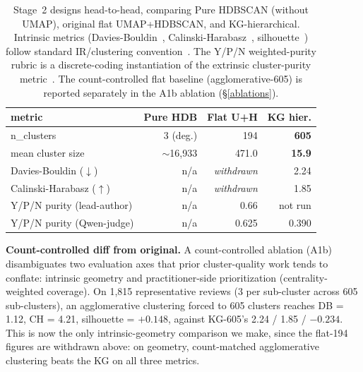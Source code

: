 \documentclass[sigconf, anonymous]{acmart}
\begin{document}
\begin{table}[t]\centering\footnotesize
  \caption{Stage~2 designs head-to-head, comparing Pure HDBSCAN (without UMAP), original flat
  UMAP+HDBSCAN, and KG-hierarchical. Intrinsic metrics (Davies-Bouldin~\cite{davies1979cluster},
   Calinski-Harabasz~\cite{calinski1974dendrite}, silhouette~\cite{rousseeuw1987silhouettes})
  follow standard IR/clustering convention~\cite{schutze2008introduction,
  steinbach2000comparison, strehl2002cluster}. The Y/P/N weighted-purity rubric is a
  discrete-coding instantiation of the extrinsic cluster-purity
  metric~\cite{amigo2009comparison, schutze2008introduction}. The count-controlled flat baseline
   (agglomerative-605) is reported separately in the A1b ablation            
  (\S\ref{ablations}).}\label{tab:cluster-quality}
  \begin{tabular}{@{}p{3.4cm}rrr@{}}\toprule
  metric & Pure HDB & Flat U+H & \textbf{KG hier.} \\\midrule
  n\_clusters & 3 (deg.) & 194 & \textbf{605} \\
  mean cluster size & $\sim$16{,}933 & 471.0 & \textbf{15.9} \\
  Davies-Bouldin ($\downarrow$) & n/a & \emph{withdrawn} & 2.24 \\
  Calinski-Harabasz ($\uparrow$) & n/a & \emph{withdrawn} & 1.85 \\
  Y/P/N purity (lead-author) & n/a & 0.66 & not run \\
  Y/P/N purity (Qwen-judge) & n/a & 0.625 & 0.390 \\
  \bottomrule\end{tabular}\end{table}
  
\textbf{Count-controlled diff from original.} A count-controlled ablation (A1b) disambiguates
  two evaluation axes that prior cluster-quality work tends to conflate: intrinsic geometry and
  practitioner-side prioritization (centrality-weighted coverage). On 1{,}815 representative
  reviews (3 per sub-cluster across 605 sub-clusters), an agglomerative clustering forced to 605
   clusters reaches DB = 1.12, CH = 4.21, silhouette = $+0.148$, against KG-605's 2.24 / 1.85 /
  $-0.234$. This is now the only intrinsic-geometry comparison we make, since the flat-194 figures are
  withdrawn above: on geometry, count-matched agglomerative clustering beats the KG on all three
  metrics.
\end{document}

